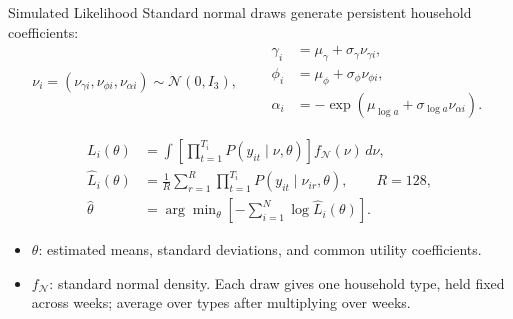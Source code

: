\gdef\shortbuttons{\hyperlink{short-29}{\beamergotobutton{Back}}}
\begin{frame}[label=short-likelihood,noframenumbering]{Simulated Likelihood}
  \footnotesize
  Standard normal draws generate persistent household coefficients:
  \[
    \nu_i=(\nu_{\gamma i},\nu_{\phi i},\nu_{\alpha i})\sim\mathcal N(0,I_3),
    \qquad
    \begin{aligned}
      \gamma_i&=\mu_\gamma+\sigma_\gamma\nu_{\gamma i},\\
      \phi_i&=\mu_\phi+\sigma_\phi\nu_{\phi i},\\
      \alpha_i&=-\exp(\mu_{\log a}+\sigma_{\log a}\nu_{\alpha i}).
    \end{aligned}
  \]
  \vspace{-1ex}
  \begingroup
  \setlength{\jot}{7pt}

\vspace{-2ex}
    \begin{align*}
      L_i(\theta)
        &=\int\!\left[\prod\nolimits_{t=1}^{T_i}P(y_{it}\mid\nu,\theta)\right]
             f_{\mathcal N}(\nu)\,d\nu,\\
      \widehat L_i(\theta)
        &=\frac{1}{R}\sum\nolimits_{r=1}^{R}\prod\nolimits_{t=1}^{T_i}
             P(y_{it}\mid\nu_{ir},\theta),\qquad R=128,\\
      \widehat\theta&=\arg\min\nolimits_\theta\left[-\sum\nolimits_{i=1}^{N}\log\widehat L_i(\theta)\right].
    \end{align*}
  \endgroup
  \vspace{-1ex}
  \begin{itemize}
    \item $\theta$: estimated means, standard deviations, and common utility coefficients.
    \item $f_{\mathcal N}$: standard normal density. Each draw gives one household type,
      held fixed across weeks; average over types after multiplying over weeks.
  \end{itemize}
\end{frame}



